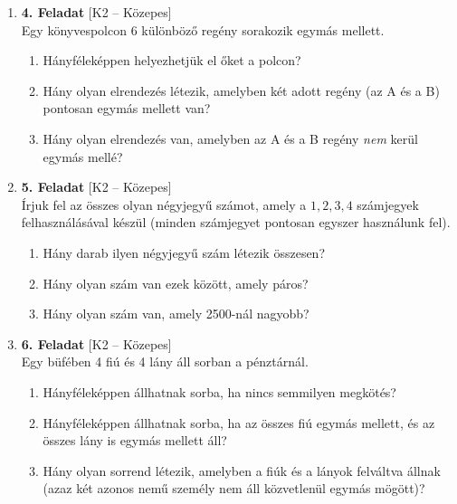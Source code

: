 \documentclass[12pt,a4paper]{article}
\begin{document}
\begin{enumerate}[label=\arabic*., leftmargin=*]
    \item \textbf{4. Feladat} \textsf{\small [K2 – Közepes]} \\
    Egy könyvespolcon 6 különböző regény sorakozik egymás mellett.
    \begin{enumerate}[label=\alph*)]
        \item Hányféleképpen helyezhetjük el őket a polcon?
        \item Hány olyan elrendezés létezik, amelyben két adott regény (az A és a B) pontosan egymás mellett van?
        \item Hány olyan elrendezés van, amelyben az A és a B regény \emph{nem} kerül egymás mellé?
    \end{enumerate}

    \vspace{0.4cm}

    \item \textbf{5. Feladat} \textsf{\small [K2 – Közepes]} \\
    Írjuk fel az összes olyan négyjegyű számot, amely a $1, 2, 3, 4$ számjegyek felhasználásával készül (minden számjegyet pontosan egyszer használunk fel). 
    \begin{enumerate}[label=\alph*)]
        \item Hány darab ilyen négyjegyű szám létezik összesen?
        \item Hány olyan szám van ezek között, amely páros?
        \item Hány olyan szám van, amely 2500-nál nagyobb?
    \end{enumerate}

    \vspace{0.4cm}

    \item \textbf{6. Feladat} \textsf{\small [K2 – Közepes]} \\
    Egy büfében 4 fiú és 4 lány áll sorban a pénztárnál.
    \begin{enumerate}[label=\alph*)]
        \item Hányféleképpen állhatnak sorba, ha nincs semmilyen megkötés?
        \item Hányféleképpen állhatnak sorba, ha az összes fiú egymás mellett, és az összes lány is egymás mellett áll?
        \item Hány olyan sorrend létezik, amelyben a fiúk és a lányok felváltva állnak (azaz két azonos nemű személy nem áll közvetlenül egymás mögött)?
    \end{enumerate}


\end{enumerate}
\end{document}
